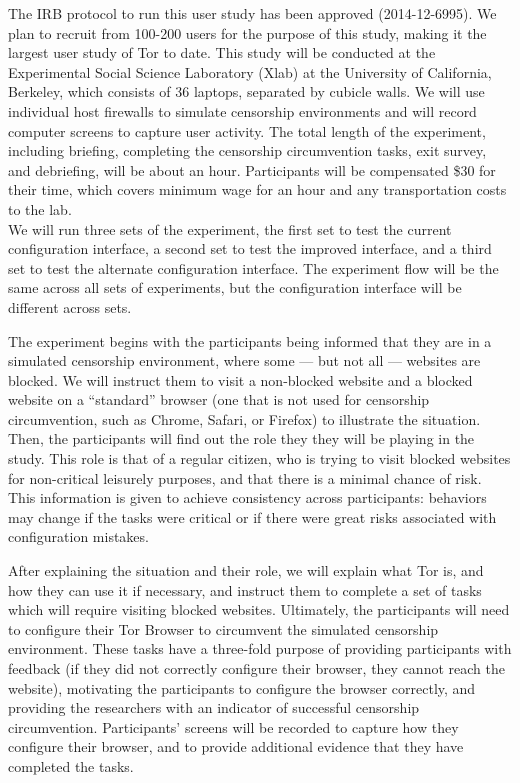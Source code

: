 \documentclass{template}
\begin{document}
The IRB protocol to run this user study has been approved (2014-12-6995). 
We plan to recruit from 100-200 users for the purpose of this study, 
making it the largest user study of Tor to date.  This study will be conducted at the
Experimental Social Science Laboratory (Xlab)
at the University of California, Berkeley, which consists of 36 laptops,
separated by cubicle walls. We will use individual host firewalls to simulate
censorship environments and will record computer screens to capture 
user activity. The total length of the experiment, including briefing, completing the censorship 
circumvention tasks, exit survey, and debriefing, will be about an hour.
Participants will be compensated \$30 for their time, which covers
minimum wage for an hour and any transportation costs to the lab.  \\

We will run three sets of the experiment, the first set to test the current configuration
interface, a second set to test the improved interface, and a third set to test the 
alternate configuration interface. The experiment flow will be the same across all 
sets of experiments, but the configuration interface will be different across sets. 

The experiment begins with the participants being informed that they are in a
simulated censorship
environment, where some --- but not all --- websites are blocked. We will
instruct them to visit a non-blocked website and a blocked website on a
``standard'' browser (one that is not used for censorship circumvention, such
as Chrome, Safari, or Firefox) to illustrate the situation.
Then, the participants will find out the role they they will be playing in the study.
This role is that of a regular citizen, who is trying to visit blocked websites
for non-critical leisurely purposes,
and that there is a minimal chance of risk. This information is given
to achieve
consistency across participants: behaviors may change if the tasks were 
critical or if there were great risks associated with configuration mistakes. 

After explaining the situation and their role, we will explain what Tor is, and
how they can use it if necessary, and instruct them to complete a set of
tasks which will require visiting blocked websites. Ultimately, the
participants will need to configure their Tor Browser to circumvent the
simulated censorship environment. These tasks have a three-fold purpose of
providing participants with feedback (if they did not correctly configure their
browser, they cannot reach the website),  motivating the participants to
configure the browser correctly, and providing the researchers with an
indicator of successful censorship circumvention.
Participants' screens will be recorded to capture how they configure
their browser, and to provide additional evidence that they have completed the
tasks.
\end{document}
